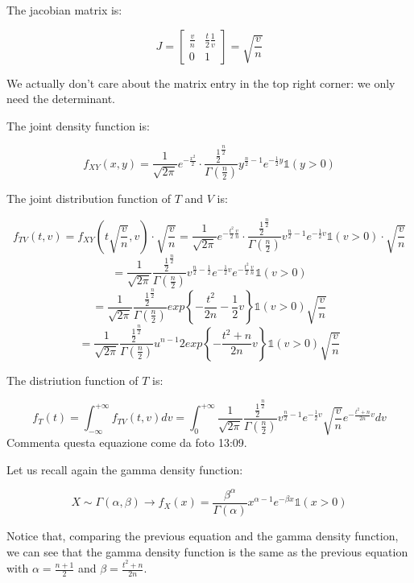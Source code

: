 The jacobian matrix is:

\[ J = \begin{bmatrix}
    \frac{v}{n} & \frac{t}{2} \frac{1}{v} \\
    0 & 1
\end{bmatrix} = \sqrt{\frac{v}{n}}
\]

We actually don't care about the matrix entry in the top right corner: we only need the determinant.

The joint density function is:

\[ 
f_{XY} (x,y) = \frac{1}{\sqrt{2 \pi}} e^{-\frac{x^2}{2}} \cdot \frac{\frac{1}{2}^{\frac{n}{2}}}{\Gamma (\frac{n}{2})} y^{\frac{n}{2}-1} e^{- \frac{1}{2}y} \mathbb{1}(y>0)
\]

The joint distribution function of \(T\) and \(V\) is:

\[ 
f_{TV} (t,v) = f_{XY} (t \sqrt{\frac{v}{n}}, v) \cdot \sqrt{\frac{v}{n}} = \frac{1}{\sqrt{2 \pi}} e^{-\frac{t^2}{2} \frac{v}{n}} \cdot \frac{\frac{1}{2}^{\frac{n}{2}}}{\Gamma (\frac{n}{2})} v^{\frac{n}{2}-1} e^{- \frac{1}{2}v} \mathbb{1}(v>0) \cdot \sqrt{\frac{v}{n}}
\]
\[
= \frac{1}{\sqrt{2 \pi}} \frac{\frac{1}{2}^{\frac{n}{2}}}{\Gamma (\frac{n}{2})} v^{\frac{n}{2}-\frac{1}{2}} e^{-\frac{1}{2}v} e^{-\frac{t^2}{2} \frac{v}{n}} \mathbb{1}(v>0)
\]
\[
= \frac{1}{\sqrt{2 \pi}} \frac{\frac{1}{2}^{\frac{n}{2}}}{\Gamma (\frac{n}{2})} exp \left\{ -\frac{t^2}{2n} - \frac{1}{2} v \right\} \mathbb{1}(v>0) \sqrt{\frac{v}{n}}
\]
\[
= \frac{1}{\sqrt{2 \pi}} \frac{\frac{1}{2}^{\frac{n}{2}}}{\Gamma (\frac{n}{2})} u^{n-1}{2}  exp \left\{ - \frac{t^2+n}{2n} v \right\} \mathbb{1}(v>0) \sqrt{ \frac{v}{n}}
\]

The distriution function of \(T\) is:

\[
f_T (t) = \int_{-\infty}^{+\infty} f_{TV} (t,v) dv = \int_{0}^{+\infty} \frac{1}{\sqrt{2 \pi}} \frac{\frac{1}{2}^{\frac{n}{2}}}{\Gamma (\frac{n}{2})} v^{\frac{n}{2}-1} e^{-\frac{1}{2}v} \sqrt{\frac{v}{n}} e^{-\frac{t^2+n}{2n}v} dv
\]
Commenta questa equazione come da foto 13:09.


Let us recall again the gamma density function:

\[
X \sim \Gamma (\alpha, \beta) \rightarrow f_X (x) = \frac{\beta^\alpha}{\Gamma (\alpha)} x^{\alpha-1} e^{-\beta x} \mathbb{1}(x>0)
\]

Notice that, comparing the previous equation and the gamma density function, we can see that the gamma density function is the same as the previous equation with \(\alpha = \frac{n+1}{2}\) and \(\beta = \frac{t^2+n}{2n}\).


